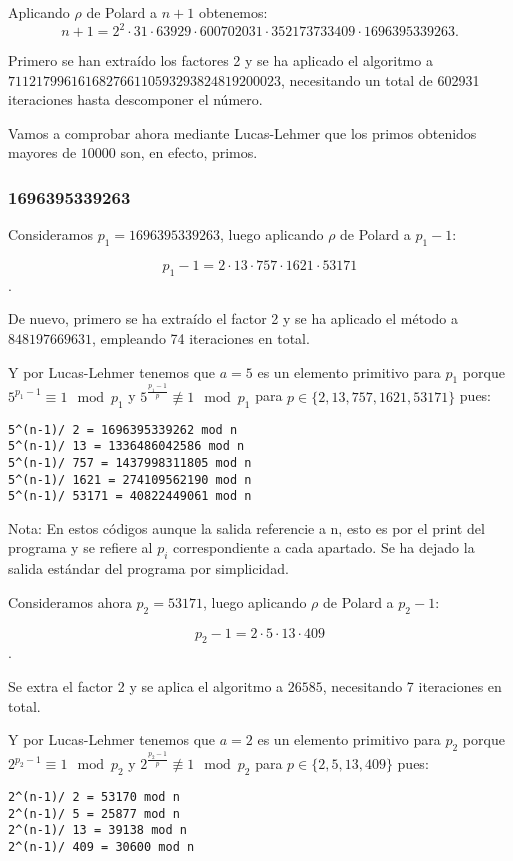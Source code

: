 \documentclass[a4paper]{article}
\begin{document}
Aplicando $\rho$ de Polard a $n+1$ obtenemos:
$$n+1 = 2^2\cdot 31 \cdot 63929\cdot 600702031\cdot 352173733409\cdot 1696395339263.$$

Primero se han extraído los factores 2 y se ha aplicado el algoritmo a $711217996161682766110593293824819200023$, necesitando un total de 602931 iteraciones hasta descomponer el número.

Vamos a comprobar ahora mediante Lucas-Lehmer que los primos obtenidos mayores de $10000$ son, en efecto, primos.

\subsubsection{1696395339263}
Consideramos $p_1=1696395339263$, luego aplicando $\rho$ de Polard a $p_1-1$:

$$p_1-1=2 \cdot 13 \cdot 757 \cdot 1621 \cdot 53171$$.

De nuevo, primero se ha extraído el factor 2 y se ha aplicado el método a $848197669631$, empleando 74 iteraciones en total.

Y por Lucas-Lehmer tenemos que $a=5$ es un elemento primitivo para $p_1$ porque $5^{p_1-1}\equiv 1\mod p_1$ y $5^{\frac{p_1-1}{p}}\not\equiv 1\mod p_1 $ para $p\in\{2, 13, 757, 1621, 53171\}$ pues:

\begin{verbatim}
5^(n-1)/ 2 = 1696395339262 mod n
5^(n-1)/ 13 = 1336486042586 mod n
5^(n-1)/ 757 = 1437998311805 mod n
5^(n-1)/ 1621 = 274109562190 mod n
5^(n-1)/ 53171 = 40822449061 mod n
\end{verbatim}
Nota: En estos códigos aunque la salida referencie a n, esto es por el print del programa y se refiere al $p_i$ correspondiente a cada apartado. Se ha dejado la salida estándar del programa por simplicidad.

Consideramos ahora $p_2=53171$, luego aplicando $\rho$ de Polard a $p_2-1$:

$$p_2-1=2 \cdot 5 \cdot 13 \cdot 409$$.

Se extra el factor 2 y se aplica el algoritmo a $26585$, necesitando 7 iteraciones en total.

Y por Lucas-Lehmer tenemos que $a=2$ es un elemento primitivo para $p_2$ porque $2^{p_2-1}\equiv 1\mod p_2$ y $2^{\frac{p_2-1}{p}}\not\equiv 1\mod p_2 $ para $p\in\{2, 5, 13, 409\}$ pues:

\begin{verbatim}
2^(n-1)/ 2 = 53170 mod n
2^(n-1)/ 5 = 25877 mod n
2^(n-1)/ 13 = 39138 mod n
2^(n-1)/ 409 = 30600 mod n
\end{verbatim}
\end{document}

